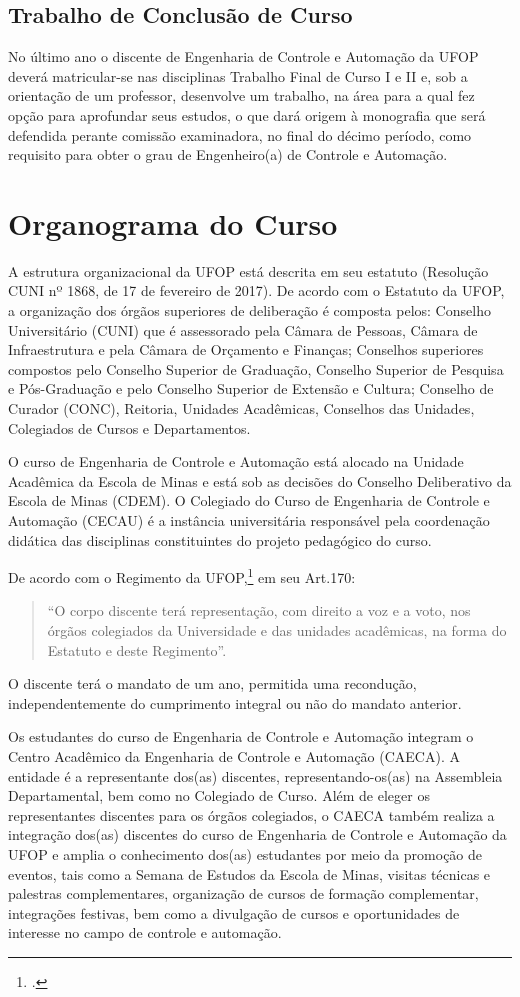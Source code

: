 \documentclass[
	12pt,				%
	openright,			%
	oneside,			%
	a4paper,			%
	english,			%
	brazil				%
	]{abntex2}
\begin{document}
\subsection{Trabalho de Conclusão de Curso}
No último ano o discente de Engenharia de Controle e Automação da UFOP deverá matricular-se nas disciplinas Trabalho Final de Curso I e II e, sob a orientação de um professor, desenvolve um trabalho, na área para a qual fez opção para aprofundar seus estudos, o que dará origem à monografia que será defendida perante comissão examinadora, no final do décimo período, como requisito para obter o grau de Engenheiro(a) de Controle e Automação.

\section{Organograma do Curso}
%
A estrutura organizacional da UFOP está descrita em seu estatuto (Resolução CUNI nº 1868, de 17 de fevereiro de 2017). De acordo com o Estatuto da UFOP, a organização dos órgãos superiores de deliberação é composta pelos: Conselho Universitário (CUNI) que é assessorado pela Câmara de Pessoas, Câmara de Infraestrutura e pela Câmara de Orçamento e Finanças; Conselhos superiores compostos pelo Conselho Superior de Graduação, Conselho Superior de Pesquisa e Pós-Graduação e pelo Conselho Superior de Extensão e Cultura; Conselho de Curador (CONC), Reitoria, Unidades Acadêmicas, Conselhos das Unidades, Colegiados de Cursos e Departamentos.

O curso de Engenharia de Controle e Automação está alocado na Unidade Acadêmica da Escola de Minas e está sob as decisões do Conselho Deliberativo da Escola de Minas (CDEM). O Colegiado do Curso de Engenharia de Controle e Automação (CECAU) é a instância universitária responsável pela coordenação didática das disciplinas constituintes do projeto pedagógico do curso.

De acordo com o Regimento da UFOP,\footcite{resolucao-cuni-1959} em seu Art.170:
\begin{quotation}
“O corpo discente terá representação, com direito a voz e a voto, nos órgãos colegiados da Universidade e das unidades acadêmicas, na forma do Estatuto e deste Regimento”.
\end{quotation}

O discente terá o mandato de um ano, permitida uma recondução, independentemente do cumprimento integral ou não do mandato anterior.

Os estudantes do curso de Engenharia de Controle e Automação integram o Centro Acadêmico da Engenharia de Controle e Automação (CAECA). A entidade é a representante dos(as) discentes, representando-os(as) na Assembleia Departamental, bem como no Colegiado de Curso. Além de eleger os representantes discentes para os órgãos colegiados, o CAECA também realiza a integração dos(as) discentes do curso de Engenharia de Controle e Automação da UFOP e amplia o conhecimento dos(as) estudantes por meio da promoção de eventos, tais como a Semana de Estudos da Escola de Minas, visitas técnicas e palestras complementares, organização de cursos de formação complementar, integrações festivas, bem como a divulgação de cursos e oportunidades de interesse no campo de controle e automação.
\end{document}
